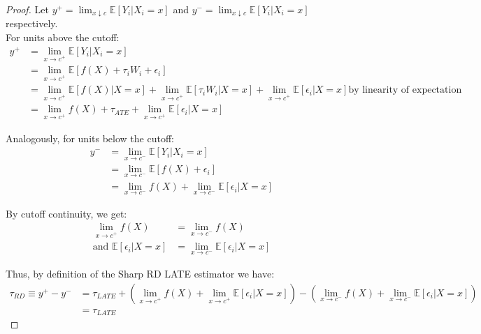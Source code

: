 \documentclass[12pt]{article}
\theoremstyle{plain}
\theoremstyle{remark}
\begin{document}
\begin{proof}
    Let $y^+ =\lim_{x\downarrow c}\mathbb{E}\left[Y_{i} |X_{i}=x \right]$ and $y^- =\lim_{x\downarrow c}\mathbb{E}\left[Y_{i} |X_{i}=x \right]$ respectively.\\
    For units above the cutoff:
    \begin{align*}
        y^+ &=\lim_{x\rightarrow c^+}\mathbb{E}\left[Y_{i} |X_{i}=x \right] \\
        &= \lim_{x\rightarrow c^+} \mathbb{E}\left[f(X)+\tau_i W_i+\epsilon_i \right]\\
        &= \lim_{x\rightarrow c^+} \mathbb{E}\left[f(X)|X=x\right]+\lim_{x\rightarrow c^+}\mathbb{E}\left[\tau_i W_i|X=x\right]+\lim_{x\rightarrow c^+}\mathbb{E}\left[\epsilon_i|X=x \right] \text{by linearity of expectation}\\
        &= \lim_{x\rightarrow c^+} f(X) + \tau_{ATE} + \lim_{x\rightarrow c^+}\mathbb{E}\left[\epsilon_i|X=x \right]
    \end{align*}

    Analogously, for units below the cutoff:
    \begin{align*}
        y^- &=\lim_{x\rightarrow c^-}\mathbb{E}\left[Y_{i} |X_{i}=x \right] \\
        &= \lim_{x\rightarrow c^-} \mathbb{E}\left[f(X)+\epsilon_i \right]\\
        &= \lim_{x\rightarrow c^-} f(X)+ \lim_{x\rightarrow c^-}\mathbb{E}\left[\epsilon_i|X=x \right]
    \end{align*}
    
    By cutoff continuity, we get:
    \begin{align*}
        \lim_{x\rightarrow c^+} f(X) &= \lim_{x\rightarrow c^-} f(X)\\
        \text{and }
        \mathbb{E}\left[\epsilon_i|X=x \right]&=\lim_{x\rightarrow c^-}\mathbb{E}\left[\epsilon_i|X=x \right]
    \end{align*}
    
    Thus, by definition of the Sharp RD LATE estimator we have: 
    \begin{align*}
        \tau_{RD}\equiv y^+-y^- &= \tau_{LATE}+\left(\lim_{x\rightarrow c^+} f(X)  + \lim_{x\rightarrow c^+}\mathbb{E}\left[\epsilon_i|X=x \right]\right) - \left(\lim_{x\rightarrow c^-} f(X)+ \lim_{x\rightarrow c^-}\mathbb{E}\left[\epsilon_i|X=x \right]\right)\\
        &=\tau_{LATE}
    \end{align*}
            
\end{proof}
        
\end{document}
